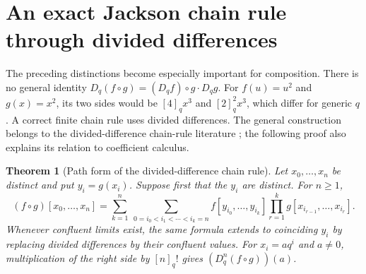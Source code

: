 \documentclass[11pt,a4paper]{article}
\numberwithin{equation}{section}
\newtheorem{theorem}{Theorem}[section]
\theoremstyle{definition}
\theoremstyle{remark}
\newcommand{\qnum}[1]{[#1]_q}
\newcommand{\qfac}[1]{[#1]_q!}
\newcommand{\Dq}{D_q}
\begin{document}
\section{An exact Jackson chain rule through divided differences}
\label{sec:chain}
The preceding distinctions become especially important for composition.
There is no general identity
$\Dq(f\circ g)=(\Dq f)\circ g\cdot\Dq g$.
For $f(u)=u^2$ and $g(x)=x^2$, its two sides would be
$\qnum4x^3$ and $\qnum2^2x^3$, which differ for generic $q$.
A correct finite chain rule uses divided differences. The general
construction belongs to the divided-difference chain-rule literature
\cite{floaterlyche}; the following proof also explains its relation to
coefficient calculus.

\begin{theorem}[Path form of the divided-difference chain rule]
Let $x_0,\ldots,x_n$ be distinct and put $y_i=g(x_i)$. Suppose first that
the $y_i$ are distinct. For $n\ge1$,
\begin{equation}
 \boxed{\displaystyle
 (f\circ g)[x_0,\ldots,x_n]
 =\sum_{k=1}^n\ \sum_{0=i_0<i_1<\cdots<i_k=n}
   f[y_{i_0},\ldots,y_{i_k}]
   \prod_{r=1}^k g[x_{i_{r-1}},\ldots,x_{i_r}].}
 \label{eq:dd-chain}
\end{equation}
Whenever confluent limits exist, the same formula extends to coinciding
$y_i$ by replacing divided differences by their confluent values.
For $x_i=aq^i$ and $a\ne0$, multiplication of the right side by
$\qfac n$ gives $(\Dq^n(f\circ g))(a)$.
\end{theorem}
\end{document}
